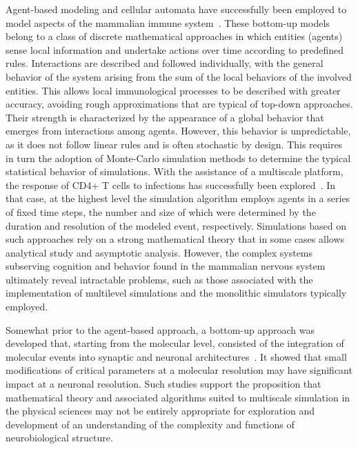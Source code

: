 \documentclass[11pt,3p,twocolumn]{JMN}
\begin{document}
Agent-based modeling and cellular automata have successfully been employed to model aspects of the mammalian immune system~\citep{chiacchio14}. These bottom-up models belong to a class of discrete mathematical approaches in which entities (agents) sense local information and undertake actions over time according to predefined rules. Interactions are described and followed individually, with the general behavior of the system arising from the sum of the local behaviors of the involved entities. This allows local immunological processes to be described with greater accuracy, avoiding rough approximations that are typical of top-down approaches. Their strength is characterized by the appearance of a global behavior that emerges from interactions among agents. However, this behavior is unpredictable, as it does not follow linear rules and is often stochastic by design. This requires in turn the adoption of Monte-Carlo simulation methods to determine the typical statistical behavior of simulations. With the assistance of a multiscale platform, the response of CD4+ T cells to infections has successfully been explored~\citep{wertheim21}. In that case, at the highest level the simulation algorithm employs agents in a series of fixed time steps, the number and size of which were determined by the duration and resolution of the modeled event, respectively. Simulations based on such approaches rely on a strong mathematical theory that in some cases allows analytical study and asymptotic analysis. However, the complex systems subserving cognition and behavior found in the mammalian nervous system ultimately reveal intractable problems, such as those associated with the implementation of multilevel simulations and the monolithic simulators typically employed.

Somewhat prior to the agent-based approach, a bottom-up approach was developed that, starting from the molecular level, consisted of the integration of molecular events into synaptic and neuronal architectures~\citep{bouteiller11}. It showed that small modifications of critical parameters at a molecular resolution may have significant impact at a neuronal resolution. Such studies support the proposition that mathematical theory and associated algorithms suited to multiscale simulation in the physical sciences may not be entirely appropriate for exploration and development of an understanding of the complexity and functions of neurobiological structure.
\end{document}
